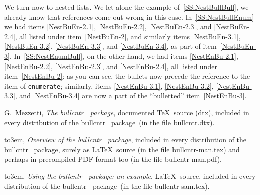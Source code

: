 \documentclass[a4paper]{article}
\DeclareRobustCommand*{\packlass}[1]{%
	{\texorpdfstring{\normalfont \sffamily}{}#1}%
}
\DeclareRobustCommand*{\filedir}[1]{{\normalfont\ttfamily #1}}
\DeclareRobustCommand*{\env}[1]{\texttt{#1}}
\newcommand*{\Bullcntr}{bullcntr}
\newcommand*{\bull}{\packlass{\Bullcntr}}
\newcommand*{\tbull}{the \bull\ package}
\newcommand*{\Enumerat}{enumerate}
\newcommand*{\enenv}{\env{\Enumerat}}
\begin{document}
We turn now to nested lists.  We let alone the example
of~\ref{SS:NestBullBull}, we already know that references come out
wrong in this case.  In~\ref{SS:NestBullEnum} we had items
\ref{NestBuEn-2.1}, \ref{NestBuEn-2.2}, \ref{NestBuEn-2.3}, and
\ref{NestBuEn-2.4}, all listed under item~\ref{NestBuEn-2}, and
similarly items \ref{NestBuEn-3.1}, \ref{NestBuEn-3.2},
\ref{NestBuEn-3.3}, and \ref{NestBuEn-3.4}, as part of
item~\ref{NestBuEn-3}.  In~\ref{SS:NestEnumBull}, on the other hand,
we had items \ref{NestEnBu-2.1}, \ref{NestEnBu-2.2},
\ref{NestEnBu-2.3}, and \ref{NestEnBu-2.4}, all listed under
item~\ref{NestEnBu-2}: as you can see, the bullets now precede the
reference to the item of \enenv; similarly, items \ref{NestEnBu-3.1},
\ref{NestEnBu-3.2}, \ref{NestEnBu-3.3}, and \ref{NestEnBu-3.4} are now
a part of the ``bulletted'' item~\ref{NestEnBu-3}.



\setcounter{secnumdepth}{0}

\begin{thebibliography}{9}
	\providecommand*{\bysame}{\leavevmode\hbox to3em{\hrulefill}\thinspace}

		G.~Mezzetti, \emph{The \bull\ package}, documented \TeX\
		source (dtx), included in every distribution of \tbull\ (in
		the file \filedir{\Bullcntr.dtx}).

		\bysame, \emph{Overview of \tbull}, included in every
		distribution of \tbull, surely as \LaTeX\ source (in the file
		\filedir{\Bullcntr-man.tex}) and perhaps in precompiled PDF
		format too (in the file \filedir{\Bullcntr-man.pdf}).

		\bysame, \emph{Using \tbull: an example}, \LaTeX\ source,
		included in every distribution of \tbull\ (in the file
		\filedir{\Bullcntr-sam.tex}).
\end{thebibliography}
\end{document}
